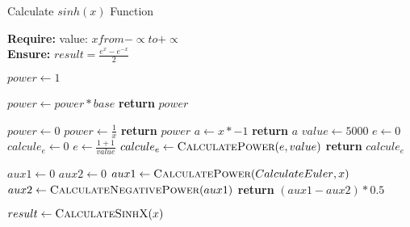 \documentclass[12pt]{article}
\begin{document}
\begin{algorithm}

\caption{Calculate $sinh(x)$ Function}

\textbf{Require:}  value: $x from -\propto to + \propto$  \\
\textbf{Ensure:} $result = \frac{e^x- e^{-x}}{2}$
\begin{algorithmic}[1]

    \State $power \leftarrow 1$
    
    \State $power \leftarrow power * base$
    \EndFor
    \State \textbf{return} $power$
    \EndProcedure
\Statex

    \State $power \leftarrow 0$
    \State $power \leftarrow \frac{1}{x}$
    \State \textbf{return} $power$
    \EndProcedure
\Statex
{}
    \State $a \leftarrow x*-1$
    \State \textbf{return} $a$
    \EndProcedure
\Statex
{}
    \State $value \leftarrow 5000$
    \State $e \leftarrow 0$
    \State $calcule_e \leftarrow 0$
    \State $e \leftarrow \frac{1+1}{value}$
    \State $calcule_e \leftarrow \Call{CalculatePower}{e,value} $
    \State \textbf{return} $calcule_e$
    \EndProcedure
\Statex

    \State $aux1 \leftarrow 0$ 
    \State $aux2 \leftarrow 0$ 
   \State $aux1 \leftarrow \Call{CalculatePower}{CalculateEuler{ },x} $
   \State $aux2 \leftarrow \Call{CalculateNegativePower}{aux1} $
    \State \textbf{return} $(aux1-aux2)*0.5${}
    \EndProcedure
\Statex


\State $ result \leftarrow \Call{CalculateSinhX}{x}$

\end{algorithmic}
\end{algorithm}
\end{document}
